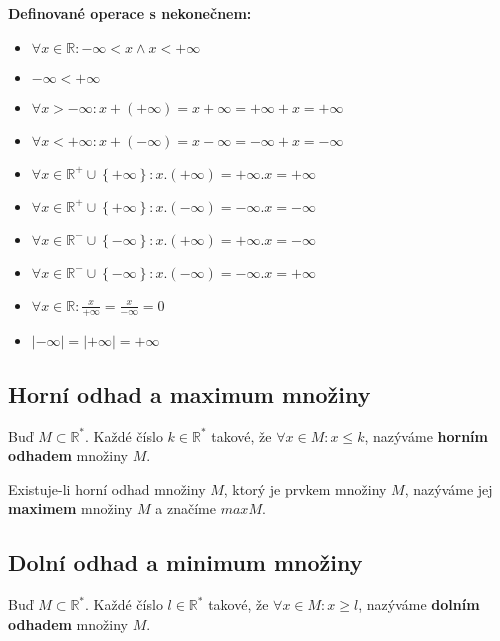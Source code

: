 \noindent \textbf{Definované operace s nekonečnem:}
\begin{itemize}
    \item \( \forall x \in \mathbb{R} : -\infty < x \land x < +\infty \)
    \item \( -\infty < +\infty \)
    \item \( \forall x > -\infty : x + (+\infty) = x + \infty = +\infty + x = +\infty \)
    \item \( \forall x < +\infty : x + (-\infty) = x - \infty = -\infty + x = -\infty \)
    \item \( \forall x \in \mathbb{R}^+ \cup \left\{+\infty \right\} : x . (+\infty) = +\infty . x = +\infty \)
    \item \( \forall x \in \mathbb{R}^+ \cup \left\{+\infty \right\} : x . (-\infty) = -\infty . x = -\infty \)
    \item \( \forall x \in \mathbb{R}^- \cup \left\{-\infty \right\} : x . (+\infty) = +\infty . x = -\infty \)
    \item \( \forall x \in \mathbb{R}^- \cup \left\{-\infty \right\} : x . (-\infty) = -\infty . x = +\infty \)
    \item \( \forall x \in \mathbb{R} : \frac{x}{+\infty} = \frac{x}{-\infty} = 0 \)
    \item \( |-\infty | = |+\infty | = +\infty \)
\end{itemize}

\newpage

\subsection{Horní odhad a maximum množiny}
Buď \( M \subset \mathbb{R}^* \). Každé číslo \( k \in \mathbb{R}^* \) takové, že \( \forall x \in M : x \leq k \), nazýváme \textbf{horním odhadem} množiny \( M \).

\bigskip

\noindent Existuje-li horní odhad množiny \( M \), ktorý je prvkem množiny \( M \), nazýváme jej \textbf{maximem} množiny \( M \) a značíme \( max M \).

\subsection{Dolní odhad a minimum množiny}
Buď \( M \subset \mathbb{R}^* \). Každé číslo \( l \in \mathbb{R}^* \) takové, že \( \forall x \in M : x \geq l \), nazýváme \textbf{dolním odhadem} množiny \( M \).

\bigskip


